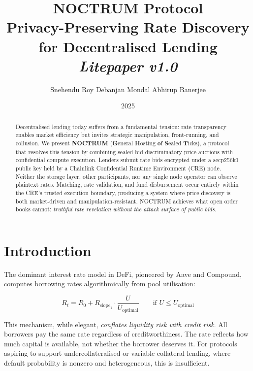 \documentclass[a4paper,11pt]{article}
\title{
    \vspace*{3cm}
    \textbf{\huge NOCTRUM Protocol} \\[0.5em]
    \Large Privacy-Preserving Rate Discovery for Decentralised Lending \\[0.2em]
    \large \textit{Litepaper v1.0}
    \vspace{2cm}
}
\author{Snehendu Roy \quad Debanjan Mondal \quad Abhirup Banerjee}
\date{2025}
\begin{document}
\maketitle
\thispagestyle{empty}

\begin{abstract}
    \noindent Decentralised lending today suffers from a fundamental tension: rate
    transparency enables market efficiency but invites strategic manipulation,
    front-running, and collusion. We present \textbf{NOCTRUM} (\textbf{G}eneral
    \textbf{H}osting \textbf{o}f \textbf{S}ealed \textbf{T}icks), a protocol
    that resolves this tension by combining sealed-bid discriminatory-price
    auctions with confidential compute execution. Lenders submit rate bids
    encrypted under a secp256k1 public key held by a Chainlink Confidential
    Runtime Environment (CRE) node. Neither the storage layer, other
    participants, nor any single node operator can observe plaintext rates.
    Matching, rate validation, and fund disbursement occur entirely within the
    CRE's trusted execution boundary, producing a system where price discovery
    is both market-driven and manipulation-resistant. NOCTRUM achieves what open
    order books cannot: \textit{truthful rate revelation without the attack
    surface of public bids.}
\end{abstract}

\clearpage
\setcounter{page}{2}

\tableofcontents
\vspace{2em}
\clearpage

\section{Introduction}

The dominant interest rate model in DeFi, pioneered by Aave and Compound,
computes borrowing rates algorithmically from pool utilisation:

\begin{equation}
    R_t = R_0 + R_{\text{slope}_1} \cdot \frac{U}{U_{\text{optimal}}}
    \qquad \text{if } U \leq U_{\text{optimal}}
    \label{eq:utilisation}
\end{equation}

This mechanism, while elegant, \textit{conflates liquidity risk with credit
risk}. All borrowers pay the same rate regardless of creditworthiness. The
rate reflects how much capital is available, not whether the borrower
deserves it. For protocols aspiring to support undercollateralised or
variable-collateral lending, where default probability is nonzero and
heterogeneous, this is insufficient.
\end{document}
